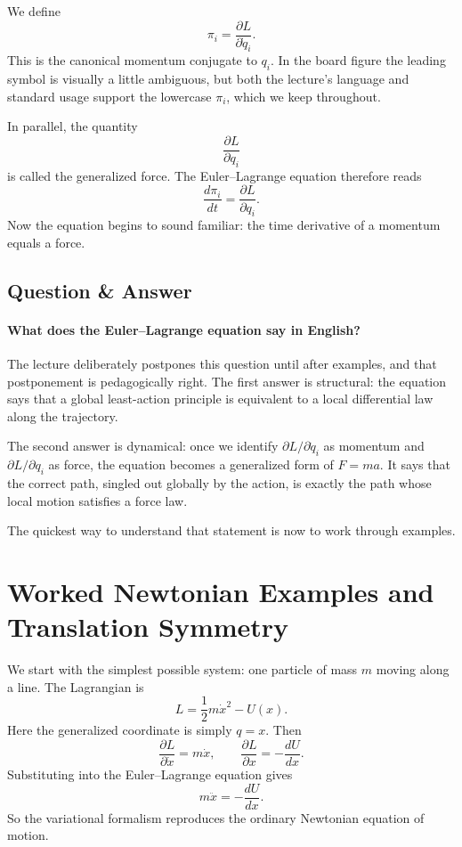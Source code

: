 We define
\begin{equation}
\pi_i=\frac{\partial L}{\partial \dot q_i}.
\end{equation}
This is the canonical momentum conjugate to \(q_i\). In the board figure the leading symbol is visually a little ambiguous, but both the lecture's language and standard usage support the lowercase \(\pi_i\), which we keep throughout.

In parallel, the quantity
\begin{equation}
\frac{\partial L}{\partial q_i}
\end{equation}
is called the generalized force. The Euler--Lagrange equation therefore reads
\begin{equation}
\frac{d\pi_i}{dt}=\frac{\partial L}{\partial q_i}.
\end{equation}
Now the equation begins to sound familiar: the time derivative of a momentum equals a force.

\subsection{Question \& Answer}

\paragraph{What does the Euler--Lagrange equation say in English?}
The lecture deliberately postpones this question until after examples, and that postponement is pedagogically right. The first answer is structural: the equation says that a global least-action principle is equivalent to a local differential law along the trajectory.

The second answer is dynamical: once we identify \(\partial L/\partial \dot q_i\) as momentum and \(\partial L/\partial q_i\) as force, the equation becomes a generalized form of \(F=ma\). It says that the correct path, singled out globally by the action, is exactly the path whose local motion satisfies a force law.

The quickest way to understand that statement is now to work through examples.

\section{Worked Newtonian Examples and Translation Symmetry}

We start with the simplest possible system: one particle of mass \(m\) moving along a line. The Lagrangian is
\begin{equation}
L=\frac12 m\dot x^2-U(x).
\end{equation}
Here the generalized coordinate is simply \(q=x\). Then
\begin{equation}
\frac{\partial L}{\partial \dot x}=m\dot x,
\qquad
\frac{\partial L}{\partial x}=-\frac{dU}{dx}.
\end{equation}
Substituting into the Euler--Lagrange equation gives
\begin{equation}
m\ddot x=-\frac{dU}{dx}.
\end{equation}
So the variational formalism reproduces the ordinary Newtonian equation of motion.

